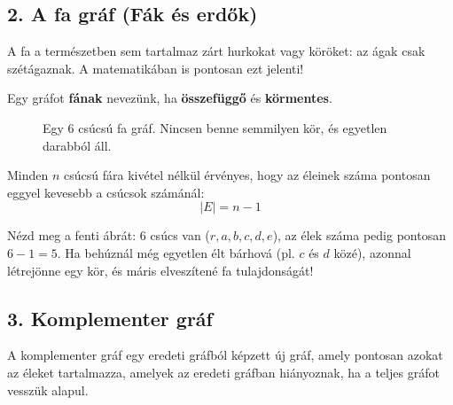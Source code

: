 \documentclass[a4paper,12pt]{article}
\theoremstyle{definition} %
\begin{document}
\subsection{2. A fa gráf (Fák és erdők)}

A fa a természetben sem tartalmaz zárt hurkokat vagy köröket: az ágak csak szétágaznak. A matematikában is pontosan ezt jelenti!

\begin{definiciodoboz}[Fa gráf]
Egy gráfot \textbf{fának} nevezünk, ha \textbf{összefüggő} és \textbf{körmentes}.
\end{definiciodoboz}

\begin{figure}[H]
    \centering
    \caption{Egy 6 csúcsú fa gráf. Nincsen benne semmilyen kör, és egyetlen darabból áll.}
    \label{fig:tree_graph}
\end{figure}

\begin{teteldoboz}
Minden $n$ csúcsú fára kivétel nélkül érvényes, hogy az éleinek száma pontosan eggyel kevesebb a csúcsok számánál:
\begin{equation}
    |E| = n - 1
\end{equation}
\end{teteldoboz}

Nézd meg a fenti ábrát: 6 csúcs van ($r, a, b, c, d, e$), az élek száma pedig pontosan $6 - 1 = 5$. Ha behúznál még egyetlen élt bárhová (pl. $c$ és $d$ közé), azonnal létrejönne egy kör, és máris elveszítené fa tulajdonságát!

\subsection{3. Komplementer gráf}

A komplementer gráf egy eredeti gráfból képzett új gráf, amely pontosan azokat az éleket tartalmazza, amelyek az eredeti gráfban hiányoznak, ha a teljes gráfot vesszük alapul.
\end{document}
